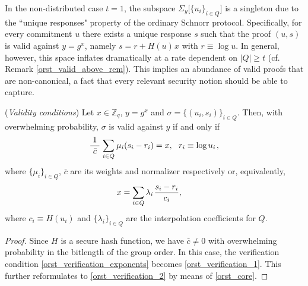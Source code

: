 \documentclass{iacrtrans}
\begin{document}
\begin{rem}
In the non-distributed case $t=1$, the subspace
$\Sigma_y \big[\{u_i\}_{i \in Q}\big]$
is a singleton due to the ``unique responses" property
of the ordinary Schnorr protocol.
Specifically, for every commitment $u$
there exists a unique response $s$
such that the proof $(u, s)$ is valid against $y=g^x$,
namely $s = r + H(u)\hspace{1pt}x$ with $r \equiv \log u$.
In general, however,
this space inflates dramatically
at a rate dependent on $|Q| \ge t$
(cf. Remark \ref{orst_valid_above_rem}).
This implies an abundance of valid proofs that
are non-canonical, a fact that
every relevant security notion should be able to capture.
\end{rem}

\begin{prop}\label{orst_validity_conditions}
\textup{(\textit{Validity conditions})}
Let $x \in \mathbb{Z}_q$, $y = g ^ x$ and
$\sigma = \{(u_i, s_i)\}_{i \in Q}$.
Then, with overwhelming probability,
$\sigma$ is valid against $y$
if and only if
\vspace{5pt}
\begin{equation}\label{orst_verification_1}
\frac{1}{\ \bar{c}\ }
\hspace{1pt}
\sum_{i \in Q}
	\hspace{0.5pt} \mu_i (s_i - r_i)
=
x,
\ \ r_i \equiv \log u_i\hspace{1pt},
\vspace{5pt}
\end{equation}
where $\{\mu_i\}_{i \in Q}$, $\bar{c}$
are its weights and normalizer respectively
or, equivalently,
\vspace{5pt}
\begin{equation}\label{orst_verification_2}
\hspace{-12pt}x
=
\sum_{i \in Q} \lambda_i\hspace{1pt}\frac{s_i - r_i}{c_i},
\vspace{5pt}
\end{equation}
where $c_i \equiv H(u_i)$
and $\{\lambda_i\}_{i \in Q}$ are the interpolation
coefficients for $Q$.
\end{prop}

\begin{proof}
Since $H$
is a secure hash function,
we have
$\bar{c} \neq 0$ with overwhelming probability
in the bitlength of the group order.
In this case,
the verification condition \eqref{orst_verification_exponents}
becomes \eqref{orst_verification_1}.
This further reformulates to
\eqref{orst_verification_2} by means of \eqref{orst_core}.
\vspace{5pt}
\end{proof}
\end{document}
